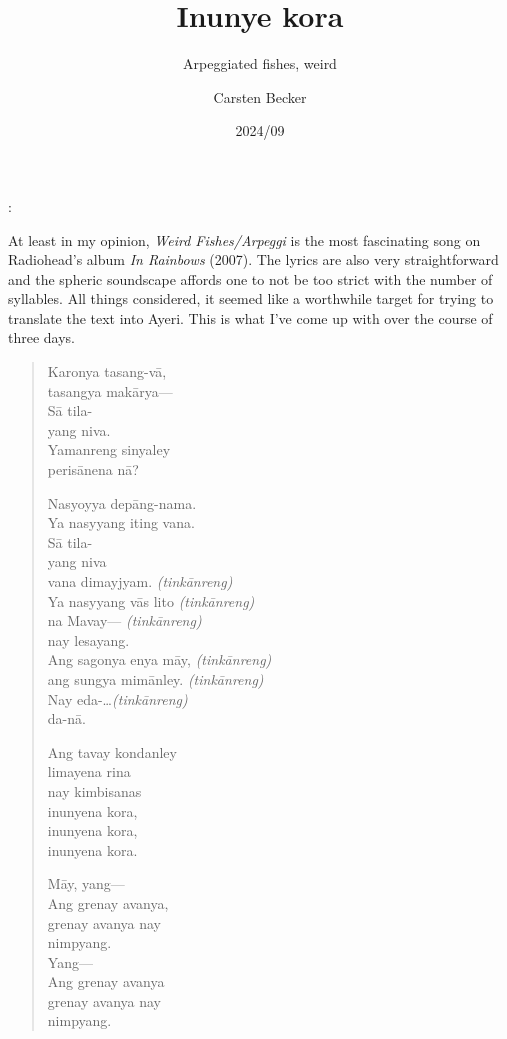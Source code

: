 \documentclass[12pt,paper=a4]{scrartcl}
\author{Carsten Becker}
\title{Inunye kora}
\subtitle{Arpeggiated fishes, weird}
\date{2024/09} %
\newcommand{\tit}[1]{\textit{#1}} %
\newenvironment{mytitle}{
	\hfill
	\begin{minipage}{0.667\textwidth}
	\vspace{\baselineskip}
	\begin{center}
		\Large
		\sffamily\bfseries
		\makeatletter
}{
		\makeatother
	\end{center}
	\vspace{1em}
	\end{minipage}
	\hfill
}
\begin{document}

\begin{mytitle}
	\@title: \@subtitle
\end{mytitle}

At least in my opinion, \tit{Weird Fishes/Arpeggi} is the most fascinating song
on Radiohead's album \tit{In Rainbows} (2007). The lyrics are also very
straightforward and the spheric soundscape affords one to not be too strict
with the number of syllables. All things considered, it seemed like a
worthwhile target for trying to translate the text into Ayeri. This is what
I've come up with over the course of three days.

\begin{quote}
\begin{multicols}{2}
Karonya tasang-vā,\\
tasangya makārya---\\
Sā tila-\\
yang niva.\\
Yamanreng sinyaley\\
perisānena nā?

Nasyoyya depāng-nama.\\
Ya nasyyang iting vana.\\
Sā tila-\\
yang niva\\
vana dimayjyam.			\tab \textit{(tinkānreng)}\\
Ya nasyyang vās lito	\tab \textit{(tinkānreng)}\\
na Mavay---				\tab \textit{(tinkānreng)}\\
nay lesayang.\\
Ang sagonya enya māy,	\tab \textit{(tinkānreng)}\\
ang sungya mimānley.	\tab \textit{(tinkānreng)}\\
Nay eda-\dots			\tab \textit{(tinkānreng)}\\
da-nā.

\columnbreak

Ang tavay kondanley\\
limayena rina\\
nay kimbisanas\\
inunyena kora,\\
inunyena kora,\\
inunyena kora.

Māy, yang---\\
Ang grenay avanya,\\
grenay avanya nay\\
nimpyang.\\
Yang---\\
Ang grenay avanya\\
grenay avanya nay\\
nimpyang.
\end{multicols}


\end{quote}
\end{document}
